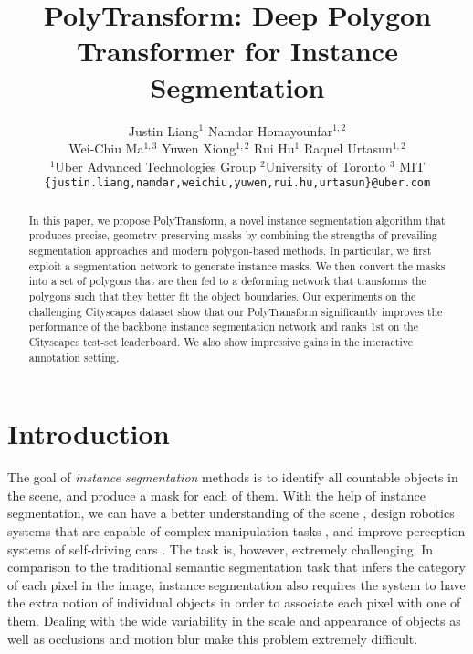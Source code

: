 \documentclass[10pt,twocolumn,letterpaper]{article}
\begin{document}
\title{PolyTransform: Deep Polygon Transformer for Instance Segmentation}

\author{
	Justin Liang$^{1}$ \quad Namdar Homayounfar$^{1,2}$\\
	Wei-Chiu Ma$^{1,3}$ \quad Yuwen Xiong$^{1,2}$ \quad Rui Hu$^{1}$ \quad Raquel Urtasun$^{1,2}$\\
	$^{1}$Uber Advanced Technologies Group \quad $^{2}$University of Toronto \quad $^{3}$ MIT\\
	\small\texttt{\{justin.liang,namdar,weichiu,yuwen,rui.hu,urtasun\}@uber.com}
}


\maketitle
\thispagestyle{empty}

\begin{abstract}

In this paper, we propose PolyTransform, a novel instance segmentation algorithm that produces precise, geometry-preserving masks by combining the strengths of prevailing segmentation approaches and modern polygon-based methods. 
 In particular, we first exploit a segmentation network to generate  instance masks. We then convert the masks into a set of polygons that are then fed to a deforming network that transforms the polygons such that they better fit the object boundaries. 
 Our experiments on the challenging Cityscapes dataset show that our PolyTransform significantly improves the performance of the backbone instance segmentation network and ranks 1st on the Cityscapes test-set leaderboard. 
We also show impressive gains in the  interactive annotation setting.
\end{abstract}

 
\vspace{-5mm}
\section{Introduction}
\vspace{-1mm}

The goal of {\it instance segmentation} methods is to identify all countable objects in the scene, and produce a mask for each of them. With the help of instance segmentation, we can have a better understanding of the scene \cite{zhou2017scene}, design robotics systems that are capable of complex manipulation tasks \cite{fazeli2019see}, and improve   perception systems of self-driving cars \cite{ma2019deep}. 
The task  is, however,  extremely challenging.
In comparison to the traditional semantic segmentation task that infers the category of each pixel in the image, instance segmentation also requires the system to have the extra notion of individual objects in order to associate each pixel with one of them. 
Dealing with the wide variability in the scale and appearance of objects as well as   occlusions and motion blur make this problem extremely difficult.   
\end{document}
